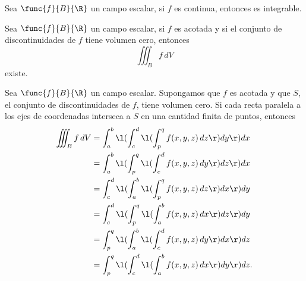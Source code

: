 \documentclass[a4,11pt]{aleph-notas}
\begin{document}
\begin{prop}
    Sea $\func{f}{B}{\R}$ un campo escalar, si $f$ es continua, entonces es integrable.
\end{prop}

\begin{prop}
    Sea $\func{f}{B}{\R}$ un campo escalar, si $f$ es acotada y si el conjunto de discontinuidades de $f$ tiene volumen cero, entonces
    \[
        \iiint_B f\, dV
    \]
    existe.
\end{prop}
   
\begin{teo}
    Sea $\func{f}{B}{\R}$ un campo escalar. Supongamos que $f$ es acotada y que $S$, el conjunto de discontinuidades de $f$, tiene volumen cero. Si cada recta paralela a los ejes de coordenadas interseca a $S$ en una cantidad finita de puntos, entonces
    \begin{align*}
        \iiint_B f\, dV 
        & = \int_a^b \l(\int_c^d \l(\int_p^q f(x,y,z)\, dz\r)dy\r)dx \\
        & = \int_a^b \l(\int_p^q\l( \int_c^d f(x,y,z)\, dy\r)dz\r)dx \\
        & = \int_c^d \l(\int_a^b\l( \int_p^q f(x,y,z)\, dz\r)dx\r)dy \\
        & = \int_c^d \l(\int_p^q\l( \int_a^b f(x,y,z)\, dx\r)dz\r)dy \\
        & = \int_p^q \l(\int_a^b\l( \int_c^d f(x,y,z)\, dy\r)dx\r)dz \\
        & = \int_p^q \l(\int_c^d \l(\int_a^b f(x,y,z)\, dx\r)dy\r)dz.
    \end{align*}
\end{teo}
   
\end{document}
